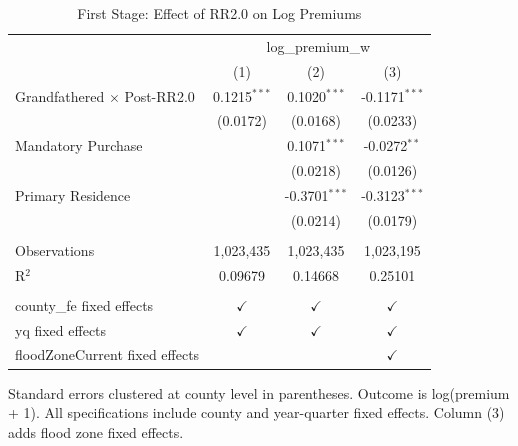 \begin{table}[htbp]
   \caption{\label{tab:first_stage} First Stage: Effect of RR2.0 on Log Premiums}
   \bigskip
   \centering
   \begin{tabular}{lccc}
      \toprule
       & \multicolumn{3}{c}{log\_premium\_w}\\
                                         & (1)            & (2)             & (3)\\  
      \midrule 
      Grandfathered $\times$ Post-RR2.0  & 0.1215$^{***}$ & 0.1020$^{***}$  & -0.1171$^{***}$\\   
                                         & (0.0172)       & (0.0168)        & (0.0233)\\   
      Mandatory Purchase                 &                & 0.1071$^{***}$  & -0.0272$^{**}$\\   
                                         &                & (0.0218)        & (0.0126)\\   
      Primary Residence                  &                & -0.3701$^{***}$ & -0.3123$^{***}$\\   
                                         &                & (0.0214)        & (0.0179)\\   
       \\
      Observations                       & 1,023,435      & 1,023,435       & 1,023,195\\  
      R$^2$                              & 0.09679        & 0.14668         & 0.25101\\  
       \\
      county\_fe fixed effects           & $\checkmark$   & $\checkmark$    & $\checkmark$\\   
      yq fixed effects                   & $\checkmark$   & $\checkmark$    & $\checkmark$\\   
      floodZoneCurrent fixed effects     &                &                 & $\checkmark$\\   
      \bottomrule
   \end{tabular}
   
   \par \raggedright 
   Standard errors clustered at county level in parentheses. Outcome is log(premium + 1). All specifications include county and year-quarter fixed effects. Column (3) adds flood zone fixed effects.
\end{table}
